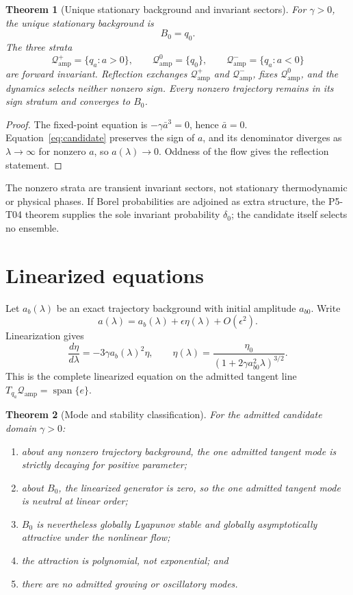 \documentclass[11pt]{article}
\newcommand{\Qamp}{\mathcal Q_{\mathrm{amp}}}
\newtheorem{theorem}{Theorem}
\begin{document}
\begin{theorem}[Unique stationary background and invariant sectors]
\label{thm:backgrounds}
For \(\gamma>0\), the unique stationary background is
\[
 B_0=q_0.
\]
The three strata
\[
 \Qamp^+=\{q_a:a>0\},\qquad
 \Qamp^0=\{q_0\},\qquad
 \Qamp^-=\{q_a:a<0\}
\]
are forward invariant.  Reflection exchanges \(\Qamp^+\) and
\(\Qamp^-\), fixes \(\Qamp^0\), and the dynamics selects neither nonzero
sign.  Every nonzero trajectory remains in its sign stratum and converges to
\(B_0\).
\end{theorem}

\begin{proof}
The fixed-point equation is \(-\gamma\bar a^3=0\), hence
\(\bar a=0\).  Equation~\eqref{eq:candidate} preserves the sign of \(a\), and
its denominator diverges as \(\lambda\to\infty\) for nonzero \(a\), so
\(a(\lambda)\to0\).  Oddness of the flow gives the reflection statement.
\end{proof}

The nonzero strata are transient invariant sectors, not stationary
thermodynamic or physical phases.  If Borel probabilities are adjoined as
extra structure, the P5-T04 theorem supplies the sole invariant probability
\(\delta_0\); the candidate itself selects no ensemble.

\section{Linearized equations}

Let \(a_b(\lambda)\) be an exact trajectory background with initial amplitude
\(a_{b0}\).  Write
\[
 a(\lambda)=a_b(\lambda)+\epsilon\eta(\lambda)+O(\epsilon^2).
\]
Linearization gives
\begin{equation}
 \frac{d\eta}{d\lambda}
 =-3\gamma a_b(\lambda)^2\eta,
 \qquad
 \eta(\lambda)
 =\frac{\eta_0}
 {(1+2\gamma a_{b0}^2\lambda)^{3/2}}.
 \label{eq:linearized}
\end{equation}
This is the complete linearized equation on the admitted tangent line
\(T_{q_a}\Qamp=\operatorname{span}\{e\}\).

\begin{theorem}[Mode and stability classification]
\label{thm:modes}
For the admitted candidate domain \(\gamma>0\):
\begin{enumerate}
 \item about any nonzero trajectory background, the one admitted tangent mode
 is strictly decaying for positive parameter;
 \item about \(B_0\), the linearized generator is zero, so the one admitted
 tangent mode is neutral at linear order;
 \item \(B_0\) is nevertheless globally Lyapunov stable and globally
 asymptotically attractive under the nonlinear flow;
 \item the attraction is polynomial, not exponential; and
 \item there are no admitted growing or oscillatory modes.
\end{enumerate}
\end{theorem}
\end{document}
